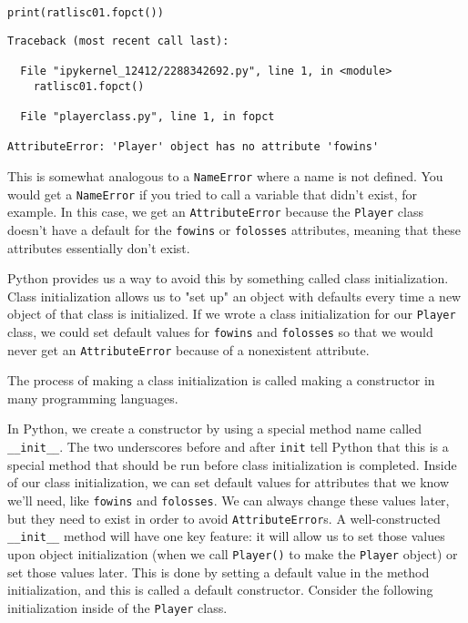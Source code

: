 \begin{lstlisting}[style=pippython]
print(ratlisc01.fopct())
\end{lstlisting}
\begin{lstlisting}[style=none]
Traceback (most recent call last):

  File "ipykernel_12412/2288342692.py", line 1, in <module>
    ratlisc01.fopct()

  File "playerclass.py", line 1, in fopct

AttributeError: 'Player' object has no attribute 'fowins'
\end{lstlisting}
This is somewhat analogous to a \verb|NameError| where a name is not defined. You would get a \verb|NameError| if you tried to call a variable that didn't exist, for example. In this case, we get an \verb|AttributeError| because the \verb|Player| class doesn't have a default for the \verb|fowins| or \verb|folosses| attributes, meaning that these attributes essentially don't exist.\par
Python provides us a way to avoid this by something called class initialization. Class initialization allows us to "set up" an object with defaults every time a new object of that class is initialized. If we wrote a class initialization for our \verb|Player| class, we could set default values for \verb|fowins| and \verb|folosses| so that we would never get an \verb|AttributeError| because of a nonexistent attribute.\par
The process of making a class initialization is called making a constructor in many programming languages.\par
In Python, we create a constructor by using a special method name called \verb|__init__|. The two underscores before and after \verb|init| tell Python that this is a special method that should be run before class initialization is completed. Inside of our class initialization, we can set default values for attributes that we know we'll need, like \verb|fowins| and \verb|folosses|. We can always change these values later, but they need to exist in order to avoid \verb|AttributeError|s. A well-constructed \verb|__init__| method will have one key feature: it will allow us to set those values upon object initialization (when we call \verb|Player()| to make the \verb|Player| object) or set those values later. This is done by setting a default value in the method initialization, and this is called a default constructor. Consider the following initialization inside of the \verb|Player| class.\par
